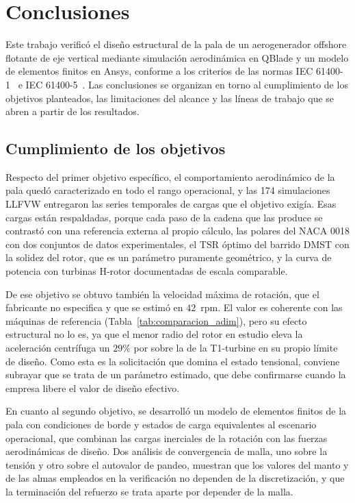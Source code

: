 \chapter{Conclusiones}

Este trabajo verificó el diseño estructural de la pala de un aerogenerador offshore flotante de eje vertical mediante simulación aerodinámica en QBlade y un modelo de elementos finitos en Ansys, conforme a los criterios de las normas IEC 61400-1~\parencite*{IEC61400-1} e IEC 61400-5~\parencite*{IEC61400-5}. Las conclusiones se organizan en torno al cumplimiento de los objetivos planteados, las limitaciones del alcance y las líneas de trabajo que se abren a partir de los resultados.

\section{Cumplimiento de los objetivos}

Respecto del primer objetivo específico, el comportamiento aerodinámico de la pala quedó caracterizado en todo el rango operacional, y las 174 simulaciones LLFVW entregaron las series temporales de cargas que el objetivo exigía. Esas cargas están respaldadas, porque cada paso de la cadena que las produce se contrastó con una referencia externa al propio cálculo, las polares del NACA 0018 con dos conjuntos de datos experimentales, el TSR óptimo del barrido DMST con la solidez del rotor, que es un parámetro puramente geométrico, y la curva de potencia con turbinas H-rotor documentadas de escala comparable.

De ese objetivo se obtuvo también la velocidad máxima de rotación, que el fabricante no especifica y que se estimó en $42$~rpm. El valor es coherente con las máquinas de referencia (Tabla~\ref{tab:comparacion_adim}), pero su efecto estructural no lo es, ya que el menor radio del rotor en estudio eleva la aceleración centrífuga un $29\%$ por sobre la de la T1-turbine en su propio límite de diseño. Como esta es la solicitación que domina el estado tensional, conviene subrayar que se trata de un parámetro estimado, que debe confirmarse cuando la empresa libere el valor de diseño efectivo.

En cuanto al segundo objetivo, se desarrolló un modelo de elementos finitos de la pala con condiciones de borde y estados de carga equivalentes al escenario operacional, que combinan las cargas inerciales de la rotación con las fuerzas aerodinámicas de diseño. Dos análisis de convergencia de malla, uno sobre la tensión y otro sobre el autovalor de pandeo, muestran que los valores del manto y de las almas empleados en la verificación no dependen de la discretización, y que la terminación del refuerzo se trata aparte por depender de la malla.

